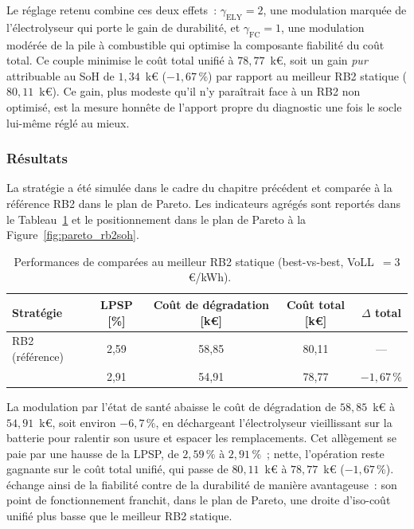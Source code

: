 Le réglage retenu combine ces deux effets~: $\gamma_{\text{ELY}} = 2$, une modulation marquée de l'électrolyseur qui porte le gain de durabilité, et $\gamma_{\text{FC}} = 1$, une modulation modérée de la pile à combustible qui optimise la composante fiabilité du coût total. Ce couple minimise le coût total unifié à $78{,}77$~k€, soit un gain \emph{pur} attribuable au SoH de $1{,}34$~k€ ($-1{,}67\,\%$) par rapport au meilleur RB2 statique ($80{,}11$~k€). Ce gain, plus modeste qu'il n'y paraîtrait face à un RB2 non optimisé, est la mesure honnête de l'apport propre du diagnostic une fois le socle lui-même réglé au mieux.

\subsubsection{Résultats}

La stratégie \RBsohH{} a été simulée dans le cadre du chapitre précédent et comparée à la référence RB2 dans le plan de Pareto. Les indicateurs agrégés sont reportés dans le Tableau~\ref{tab:rb2soh_results} et le positionnement dans le plan de Pareto à la Figure~\ref{fig:pareto_rb2soh}.

\begin{table}[h!]
\centering
\caption{Performances de \RBsohH{} comparées au meilleur RB2 statique (best-vs-best, VoLL~$=3$~€/kWh).}
\label{tab:rb2soh_results}
\begin{tabular}{lcccc}
\hline
Stratégie & LPSP [\%] & Coût de dégradation [k€] & Coût total [k€] & $\Delta$ total \\
\hline
RB2 (référence) & 2,59 & 58,85 & 80,11 & --- \\
\RBsohH{}       & 2,91 & 54,91 & 78,77 & $-1{,}67\,\%$ \\
\hline
\end{tabular}
\end{table}

La modulation par l'état de santé abaisse le coût de dégradation de $58{,}85$~k€ à $54{,}91$~k€, soit environ $-6{,}7\,\%$, en déchargeant l'électrolyseur vieillissant sur la batterie pour ralentir son usure et espacer les remplacements. Cet allègement se paie par une hausse de la LPSP, de $2{,}59\,\%$ à $2{,}91\,\%$~; nette, l'opération reste gagnante sur le coût total unifié, qui passe de $80{,}11$~k€ à $78{,}77$~k€ ($-1{,}67\,\%$). \RBsohH{} échange ainsi de la fiabilité contre de la durabilité de manière avantageuse~: son point de fonctionnement franchit, dans le plan de Pareto, une droite d'iso-coût unifié plus basse que le meilleur RB2 statique.

